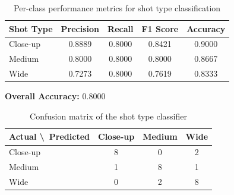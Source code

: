 \documentclass[english]{article}
\begin{document}
			\begin{table}[h!]
			\centering
				\begin{tabular}{|l|c|c|c|c|}
					\hline
						\textbf{Shot Type} & \textbf{Precision} & \textbf{Recall} & \textbf{F1 Score} & \textbf{Accuracy} \\
						\hline
						Close-up & 0.8889 & 0.8000 & 0.8421 & 0.9000 \\
						Medium   & 0.8000 & 0.8000 & 0.8000 & 0.8667 \\
						Wide     & 0.7273 & 0.8000 & 0.7619 & 0.8333 \\
					\hline
				\end{tabular}
				\caption{Per-class performance metrics for shot type classification}
			\end{table}

		\noindent\textbf{Overall Accuracy:} 0.8000

		\vspace{1em}

			\begin{table}[h!]
				\centering
					\begin{tabular}{|l|c|c|c|}
						\hline
							\textbf{Actual \textbackslash\ Predicted} & \textbf{Close-up} & \textbf{Medium} & \textbf{Wide} \\
							\hline
							Close-up & 8 & 0 & 2 \\
							Medium   & 1 & 8 & 1 \\
							Wide     & 0 & 2 & 8 \\
						\hline
					\end{tabular}
				\caption{Confusion matrix of the shot type classifier}
			\end{table}

	
\end{document}
